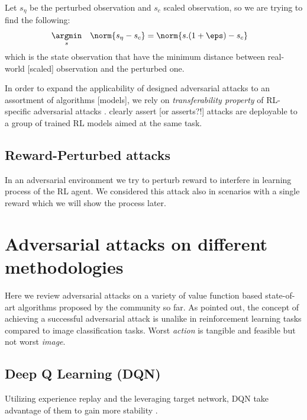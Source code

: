 \documentclass{article}
\begin{document}
    Let $s_\eta$ be the perturbed observation and $s_c$ scaled observation, so we are trying to find the following:
    \begin{equation}
        \begin{aligned}
            & \underset{s}{\argmin}
            & & {\norm{s_\eta - s_c}} = \norm{s . (1 + \eps) - s_c}
        \end{aligned}
    \end{equation}
    which is the state observation that have the minimum distance between real-world [scaled] observation and the perturbed one.

    In order to expand the applicability of designed adversarial attacks to an assortment of algorithms [models], we rely on \textit{transferability property} of RL-specific adversarial attacks \cite{Szegedy2014, Papernot2016, Goodfellow2014a}. \cite{Huang2017} clearly assert [or asserts?!] attacks are deployable to a group of trained RL models aimed at the same task.

    \subsection{Reward-Perturbed attacks}
    In an adversarial environment we try to perturb reward to interfere in learning process of the RL agent. We considered this attack also in scenarios with a single reward which we will show the process later.

    \section{Adversarial attacks on different methodologies}
    Here we review adversarial attacks on a variety of value function based state-of-art algorithms proposed by the community so far. As \cite{Pattanaik2018} pointed out, the concept of achieving a successful adversarial attack is unalike in reinforcement learning tasks compared to image classification tasks. Worst \textit{action} is tangible and feasible but not worst \textit{image}.

    \subsection{Deep Q Learning (DQN)}
    Utilizing experience replay and the leveraging target network, DQN take advantage of them to gain more stability \cite{Pattanaik2018}.
\end{document}

